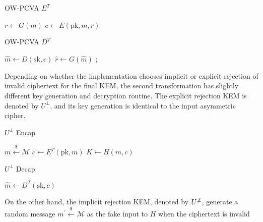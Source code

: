 \documentclass{article}
\newcommand{\leftsample}{\overset{{\scriptscriptstyle\$}}{\leftarrow}}
\begin{document}
\begin{multicols}{2}
    \begin{algorithm}[H]
        \SetAlgoLined
        \caption{OW-PCVA $E^T$}
        $r \leftarrow G(m)$\;
        $c \leftarrow E(\text{pk}, m, r)$\;
        \;
    \end{algorithm}

    \columnbreak

    \begin{algorithm}[H]
        \SetAlgoLined
        \caption{OW-PCVA $D^T$}
        $\hat{m} \leftarrow D(\text{sk}, c)$\;
        $\hat{r} \leftarrow G(\hat{m})$\;
        ;
    \end{algorithm}
\end{multicols}

Depending on whether the implementation chooses implicit or explicit rejection of invalid ciphertext for the final KEM, the second transformation has slightly different key generation and decryption routine. The explicit rejection KEM is denoted by $U^\bot$, and its key generation is identical to the input asymmetric cipher.

\begin{multicols}{2}
    \begin{algorithm}[H]
        \SetAlgoLined
        \caption{$U^\bot$ Encap}
        $m \leftsample \mathcal{M}$\;
        $c \leftarrow E^T(\text{pk}, m)$\;
        $K \leftarrow H(m, c)$ \;
    \end{algorithm}
    \columnbreak

    \begin{algorithm}[H]
        \SetAlgoLined
        \caption{$U^\bot$ Decap}
        $\hat{m} \leftarrow D^T(\text{sk}, c)$\;
    \end{algorithm}
\end{multicols}

On the other hand, the implicit rejection KEM, denoted by $U^{\not\bot}$, generate a random message $m^\prime \leftsample \mathcal{M}$ as the fake input to $H$ when the ciphertext is invalid
\end{document}
